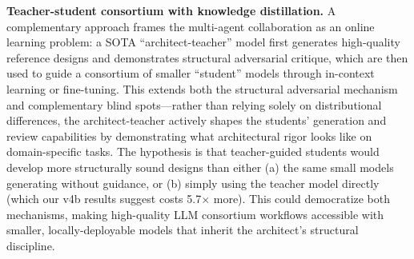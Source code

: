 \documentclass[conference]{IEEEtran}
\begin{document}
\textbf{Teacher-student consortium with knowledge distillation.} A complementary approach frames the multi-agent collaboration as an online learning problem: a SOTA ``architect-teacher'' model first generates high-quality reference designs and demonstrates structural adversarial critique, which are then used to guide a consortium of smaller ``student'' models through in-context learning or fine-tuning. This extends both the structural adversarial mechanism and complementary blind spots---rather than relying solely on distributional differences, the architect-teacher actively shapes the students' generation and review capabilities by demonstrating what architectural rigor looks like on domain-specific tasks. The hypothesis is that teacher-guided students would develop more structurally sound designs than either (a) the same small models generating without guidance, or (b) simply using the teacher model directly (which our v4b results suggest costs 5.7$\times$ more). This could democratize both mechanisms, making high-quality LLM consortium workflows accessible with smaller, locally-deployable models that inherit the architect's structural discipline.
\end{document}
